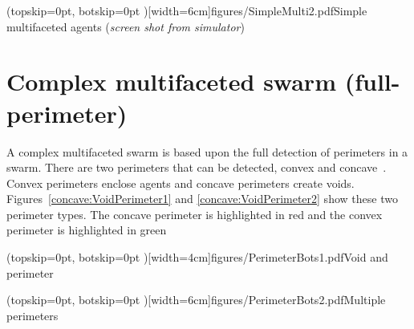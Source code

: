 \documentclass{ieeeaccess}
\begin{document}
\Figure[t!](topskip=0pt, botskip=0pt )[width=6cm]{figures/SimpleMulti2.pdf}{Simple multifaceted agents (\textit{screen shot from simulator})\label{reduced:SimpleMulti12}}

\section{Complex multifaceted swarm (full-perimeter)}\label{sec:complexMulti} 
A complex multifaceted swarm is based upon the full detection of perimeters in a swarm. There are two perimeters that can be detected, convex and concave~\cite{MD:09,MJ:08}. Convex perimeters enclose agents and concave perimeters create voids. Figures~\ref{concave:VoidPerimeter1} and \ref{concave:VoidPerimeter2} show these two perimeter types. The concave perimeter is highlighted in red and the convex perimeter is highlighted in green


\Figure[t!](topskip=0pt, botskip=0pt )[width=4cm]{figures/PerimeterBots1.pdf}{Void and perimeter\label{concave:VoidPerimeter1}}


\Figure[t!](topskip=0pt, botskip=0pt )[width=6cm]{figures/PerimeterBots2.pdf}{Multiple perimeters\label{concave:VoidPerimeter2}}

\end{document}

